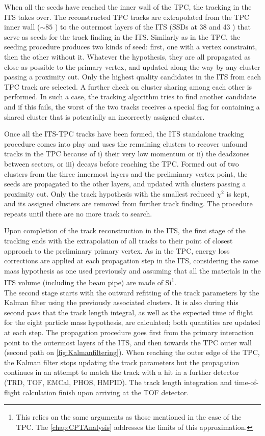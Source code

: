 When all the seeds have reached the inner wall of the TPC, the tracking in the ITS takes over. The reconstructed TPC tracks are extrapolated from the TPC inner wall ($\sim 85$ \cm) to the outermost layers of the ITS (SSDs at 38 and 43 \cm) that serve as seeds for the track finding in the ITS. Similarly as in the TPC, the seeding procedure produces two kinds of seed: first, one with a vertex constraint, then the other without it. Whatever the hypothesis, they are all propagated as close as possible to the primary vertex, and updated along the way by any cluster passing a proximity cut. Only the highest quality candidates in the ITS from each TPC track are selected. A further check on cluster sharing among each other is performed. In such a case, the tracking algorithm tries to find another candidate and if this fails, the worst of the two tracks receives a special flag for containing a shared cluster that is potentially an incorrectly assigned cluster.

Once all the ITS-TPC tracks have been formed, the ITS standalone tracking procedure comes into play and uses the remaining clusters to recover unfound tracks in the TPC because of i) their very low momentum or ii) the deadzones between sectors, or iii) decays before reaching the TPC. Formed out of two clusters from the three innermost layers and the preliminary vertex point, the seeds are propagated to the other layers, and updated with clusters passing a proximity cut. Only the track hypothesis with the smallest reduced $\chi^{2}$ is kept, and its assigned clusters are removed from further track finding. The procedure repeats until there are no more track to search. 

Upon completion of the track reconstruction in the ITS, the first stage of the tracking ends with the extrapolation of all tracks to their point of closest approach to the preliminary primary vertex. As in the TPC, energy loss corrections are applied at each propagation step in the ITS, considering the same mass hypothesis as one used previously and assuming that all the materials in the ITS volume (including the beam pipe) are made of Si\footnote{This relies on the same arguments as those mentioned in the case of the TPC. The \chap\ref{chap:CPTAnalysis} addresses the limits of this approximation.}.\\

The second stage starts with the outward refitting of the track parameters by the Kalman filter using the previously associated clusters. It is also during this second pass that the track length integral, as well as the expected time of flight for the eight particle mass hypothesis, are calculated; both quantities are updated at each step. The propagation procedure goes first from the primary interaction point to the outermost layers of the ITS, and then towards the TPC outer wall (second path on \fig\ref{fig:Kalmanfiltering}). When reaching the outer edge of the TPC, the Kalman filter stops updating the track parameters but the propagation continues in an attempt to match the track with a hit in a further detector (TRD, TOF, EMCal, PHOS, HMPID). The track length integration and time-of-flight calculation finish upon arriving at the TOF detector.\\

